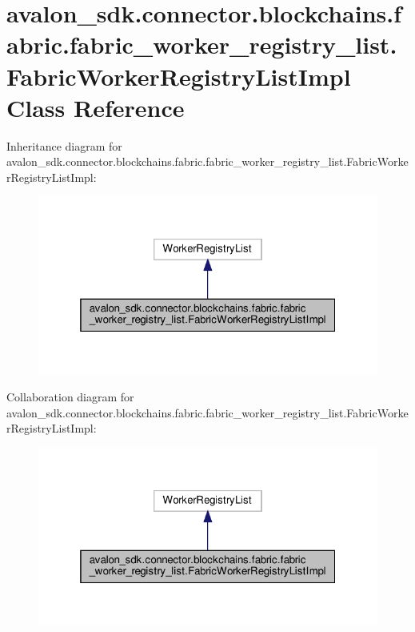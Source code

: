 \hypertarget{classavalon__sdk_1_1connector_1_1blockchains_1_1fabric_1_1fabric__worker__registry__list_1_1FabricWorkerRegistryListImpl}{}\section{avalon\+\_\+sdk.\+connector.\+blockchains.\+fabric.\+fabric\+\_\+worker\+\_\+registry\+\_\+list.\+Fabric\+Worker\+Registry\+List\+Impl Class Reference}
\label{classavalon__sdk_1_1connector_1_1blockchains_1_1fabric_1_1fabric__worker__registry__list_1_1FabricWorkerRegistryListImpl}


Inheritance diagram for avalon\+\_\+sdk.\+connector.\+blockchains.\+fabric.\+fabric\+\_\+worker\+\_\+registry\+\_\+list.\+Fabric\+Worker\+Registry\+List\+Impl\+:
\nopagebreak
\begin{figure}[H]
\begin{center}
\leavevmode
\includegraphics[width=319pt]{classavalon__sdk_1_1connector_1_1blockchains_1_1fabric_1_1fabric__worker__registry__list_1_1Fabrc34d7ee46806c1228ccdf8bef233a324}
\end{center}
\end{figure}


Collaboration diagram for avalon\+\_\+sdk.\+connector.\+blockchains.\+fabric.\+fabric\+\_\+worker\+\_\+registry\+\_\+list.\+Fabric\+Worker\+Registry\+List\+Impl\+:
\nopagebreak
\begin{figure}[H]
\begin{center}
\leavevmode
\includegraphics[width=319pt]{classavalon__sdk_1_1connector_1_1blockchains_1_1fabric_1_1fabric__worker__registry__list_1_1Fabr5f604b4203b6b3cd7bd164e468faf0ac}
\end{center}
\end{figure}
